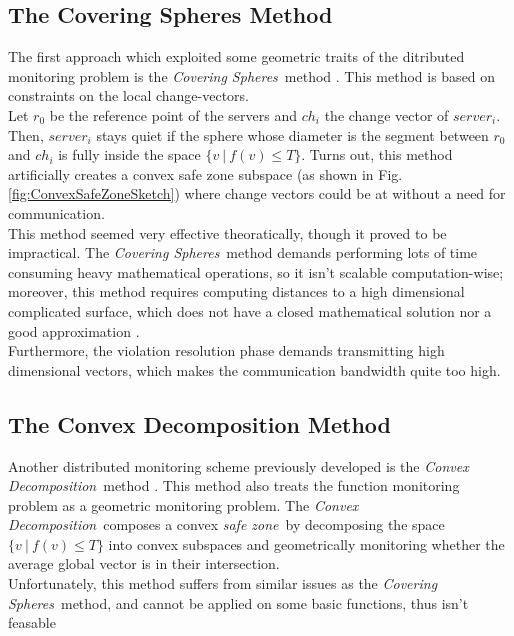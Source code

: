 \documentclass[10pt, conference]{IEEEtran}
\newcommand{\coveringSpheres}{\textit{Covering Spheres}}
\newcommand{\convexDecomposition}{\textit{Convex Decomposition}}
\newcommand{\safeZone}{\textit{safe zone}}
\begin{document}
\subsection{The Covering Spheres Method}
The first approach which exploited some geometric traits of the ditributed monitoring problem is the \coveringSpheres \ method \cite{sharfman2007geometric}. This method is based on constraints on the local change-vectors. \\
Let $r_0$ be the reference point of the servers and $ch_i$ the change vector of $server_i$. Then, $server_i$ stays quiet if the sphere whose diameter is the segment between $r_0$ and $ch_i$ is fully inside the space ${\{v \ | \ f(v) \leq T\}}$. Turns out, this method artificially creates a convex safe zone subspace (as shown in Fig. \ref{fig:ConvexSafeZoneSketch}) where change vectors could be at without a need for communication. \\
This method seemed very effective theoratically, though it proved to be impractical. The \coveringSpheres \ method demands performing lots of time consuming heavy mathematical operations, so it isn't scalable computation-wise; moreover, this method requires computing distances to a high dimensional complicated surface, which does not have a closed mathematical solution nor a good approximation \cite{lazerson2018lightweight}. \\
Furthermore, the violation resolution phase demands transmitting high dimensional vectors, which makes the communication bandwidth quite too high.
\subsection{The Convex Decomposition Method}
Another distributed monitoring scheme previously developed is the \convexDecomposition \ method \cite{lazerson2015monitoring}. This method also treats the function monitoring problem as a geometric monitoring problem. The \convexDecomposition \ composes a convex \safeZone \ by decomposing the space ${\{v \ | \ f(v) \leq T\}}$ into convex subspaces and geometrically monitoring whether the average global vector is in their intersection. \\
Unfortunately, this method suffers from similar issues as the \coveringSpheres \ method, and cannot be applied on some basic functions, thus isn't feasable \cite{lazerson2018lightweight}
\end{document}

